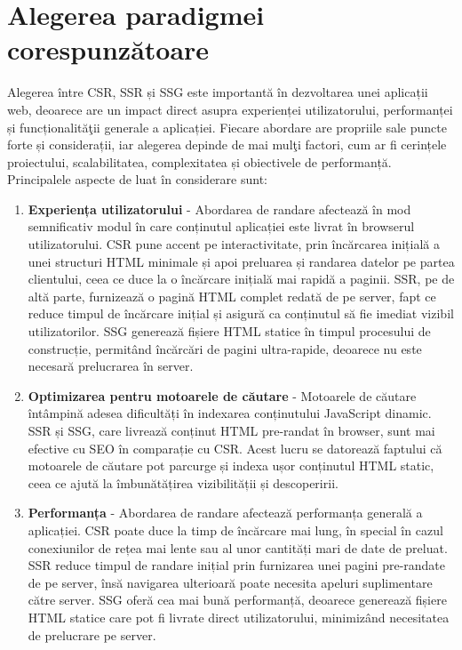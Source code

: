 \documentclass[12pt, a4paper]{report}
\begin{document}
\section{Alegerea paradigmei corespunzătoare}

Alegerea între CSR, SSR și SSG este importantă în dezvoltarea unei aplicații web, deoarece are un impact direct asupra experienței utilizatorului, performanței și funcționalit\u a\c tii generale a aplicației. Fiecare abordare are propriile sale puncte forte și considerații, iar alegerea depinde de mai mul\c ti factori, cum ar fi cerințele proiectului, scalabilitatea, complexitatea și obiectivele de performanță. Principalele aspecte de luat în considerare sunt:\cite{choose-rendering}

\begin{enumerate}
	\item \textbf{Experiența utilizatorului} - Abordarea de randare afectează în mod semnificativ modul în care conținutul aplicației este livrat în browserul utilizatorului. CSR pune accent pe interactivitate, prin încărcarea inițială a unei structuri HTML minimale și apoi preluarea și randarea datelor pe partea clientului, ceea ce duce la o încărcare inițială mai rapidă a paginii. SSR, pe de altă parte, furnizează o pagină HTML complet redată de pe server, fapt ce reduce timpul de încărcare inițial și asigur\u a ca conținutul să fie imediat vizibil utilizatorilor. SSG generează fișiere HTML statice în timpul procesului de construcție, permitând încărcări de pagini ultra-rapide, deoarece nu este necesară prelucrarea în server.
	\item \textbf{Optimizarea pentru motoarele de căutare} - Motoarele de căutare întâmpină adesea dificultăți în indexarea conținutului JavaScript dinamic. SSR și SSG, care livrează conținut HTML pre-randat în browser, sunt mai efective cu SEO în comparație cu CSR. Acest lucru se datorează faptului că motoarele de căutare pot parcurge și indexa ușor conținutul HTML static, ceea ce ajută la îmbunătățirea vizibilității și descoperirii.
	\item \textbf{Performanța} - Abordarea de randare afectează performanța generală a aplicației. CSR poate duce la timp de încărcare mai lung, în special în cazul conexiunilor de rețea mai lente sau al unor cantități mari de date de preluat. SSR reduce timpul de randare inițial prin furnizarea unei pagini pre-randate de pe server, \^ins\u a navigarea ulterioară poate necesita apeluri suplimentare către server. SSG oferă cea mai bună performanță, deoarece generează fișiere HTML statice care pot fi livrate direct utilizatorului, minimizând necesitatea de prelucrare pe server.

\end{enumerate}
\end{document}
